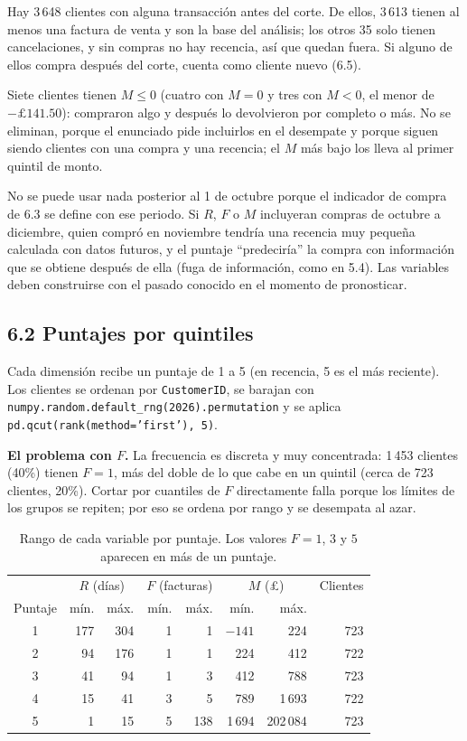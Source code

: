 \documentclass[11pt]{article}
\begin{document}
Hay 3\,648 clientes con alguna transacción antes del corte. De ellos, 3\,613 tienen al menos una factura de venta y son la base del análisis; los otros 35 solo tienen cancelaciones, y sin compras no hay recencia, así que quedan fuera. Si alguno de ellos compra después del corte, cuenta como cliente nuevo (6.5).

Siete clientes tienen $M\le 0$ (cuatro con $M=0$ y tres con $M<0$, el menor de $-\pounds{}141.50$): compraron algo y después lo devolvieron por completo o más. No se eliminan, porque el enunciado pide incluirlos en el desempate y porque siguen siendo clientes con una compra y una recencia; el $M$ más bajo los lleva al primer quintil de monto.

No se puede usar nada posterior al 1 de octubre porque el indicador de compra de 6.3 se define con ese periodo. Si $R$, $F$ o $M$ incluyeran compras de octubre a diciembre, quien compró en noviembre tendría una recencia muy pequeña calculada con datos futuros, y el puntaje ``predeciría'' la compra con información que se obtiene después de ella (fuga de información, como en 5.4). Las variables deben construirse con el pasado conocido en el momento de pronosticar.

\subsection*{6.2 Puntajes por quintiles}
Cada dimensión recibe un puntaje de 1 a 5 (en recencia, 5 es el más reciente). Los clientes se ordenan por \texttt{CustomerID}, se barajan con \texttt{numpy.random.default\_rng(2026).permutation} y se aplica \texttt{pd.qcut(rank(method='first'), 5)}.

\textbf{El problema con $F$.} La frecuencia es discreta y muy concentrada: 1\,453 clientes (40\%) tienen $F=1$, más del doble de lo que cabe en un quintil (cerca de 723 clientes, 20\%). Cortar por cuantiles de $F$ directamente falla porque los límites de los grupos se repiten; por eso se ordena por rango y se desempata al azar.

\begin{table}[H]
\centering
\begin{tabular}{c|rr|rr|rr|r}
\hline
 & \multicolumn{2}{c|}{$R$ (días)} & \multicolumn{2}{c|}{$F$ (facturas)} & \multicolumn{2}{c|}{$M$ (\pounds{})} & Clientes \\
Puntaje & mín. & máx. & mín. & máx. & mín. & máx. & \\
\hline
1 & 177 & 304 & 1 & 1 & $-141$ & 224 & 723 \\
2 & 94 & 176 & 1 & 1 & 224 & 412 & 722 \\
3 & 41 & 94 & 1 & 3 & 412 & 788 & 723 \\
4 & 15 & 41 & 3 & 5 & 789 & 1\,693 & 722 \\
5 & 1 & 15 & 5 & 138 & 1\,694 & 202\,084 & 723 \\
\hline
\end{tabular}
\caption{Rango de cada variable por puntaje. Los valores $F=1$, $3$ y $5$ aparecen en más de un puntaje.}
\label{tab:p6rangos}
\end{table}
\end{document}
